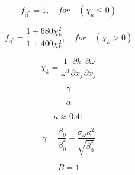 \begin{equation}
f_{\beta^*} = 1, \quad for \quad \left( \chi_k \leq 0 \right)
\end{equation}

\begin{equation}
f_{\beta^*} = \frac{1+680 \chi_k^2}{1+400 \chi_k^2}, \quad for \quad \left( 
  \chi_k > 0 \right)
\end{equation}

\begin{equation}
\chi_k = \frac{1}{\omega^3} \frac{\partial k}{\partial x_j}
  \frac{\partial \omega}{\partial x_j}
\end{equation}

\begin{equation}
\gamma
\end{equation}

\begin{equation}
\alpha
\end{equation}

\begin{equation}
\kappa \approx 0.41
\end{equation}

\begin{equation}
\gamma = \frac{\beta_0}{\beta_0^*} - \frac{\sigma_{\omega} \kappa^2}{\sqrt{\beta_0^*}}
\end{equation}

\begin{equation}
B=1
\end{equation}


